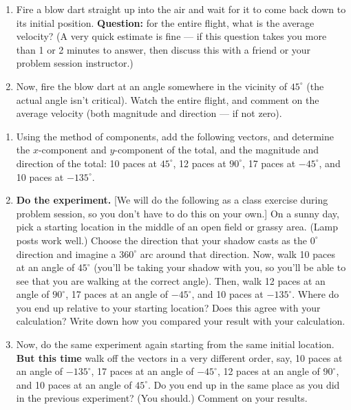 \begin{exercise}
  \begin{enumerate}
  \item Fire a blow dart straight up into the air and wait for it to
    come back down to its initial position.  \textbf{Question:} for the
    entire flight, what is the average velocity?  (A very quick
    estimate is fine --- if this question takes you more than 1 or 2
    minutes to answer, then discuss this with a friend or your problem
    session instructor.)

  \item Now, fire the blow dart at an angle somewhere in the vicinity
    of $45^\circ$ (the actual angle isn't critical).  Watch the entire
    flight, and comment on the average velocity (both magnitude and
    direction --- if not zero).
  \end{enumerate}
  \label{prob:blow_dart}
\end{exercise}



\begin{exercise}
  \begin{enumerate}
  \item Using the method of components, add the following vectors, and
    determine the $x$-component and $y$-component of the total, and
    the magnitude and direction of the total: 10 paces at $45^\circ$,
    12 paces at $90^\circ$, 17 paces at $-45^\circ$, and 10 paces at
    $-135^\circ$.

  \item \textbf{Do the experiment.}  [We will do the following as a class
    exercise during problem session, so you don't have to do this on
    your own.]  On a sunny day, pick a starting location in the middle
    of an open field or grassy area. (Lamp posts work well.)  Choose
    the direction that your shadow casts as the $0^\circ$ direction
    and imagine a $360^\circ$ arc around that direction.  Now, walk 10
    paces at an angle of $45^\circ$ (you'll be taking your shadow with
    you, so you'll be able to see that you are walking at the correct
    angle).  Then, walk 12 paces at an angle of $90^\circ$, 17 paces
    at an angle of $-45^\circ$, and 10 paces at $-135^\circ$.  Where
    do you end up relative to your starting location?  Does this agree
    with your calculation?  Write down how you compared your result
    with your calculation.

  \item Now, do the same experiment again starting from the same
    initial location.  \textbf{But this time} walk off the vectors in a
    very different order, say, 10 paces at an angle of $-135^\circ$,
    17 paces at an angle of $-45^\circ$, 12 paces at an angle of
    $90^\circ$, and 10 paces at an angle of $45^\circ$.  Do you end up
    in the same place as you did in the previous experiment?  (You
    should.)  Comment on your results.
  \end{enumerate}
\end{exercise}

